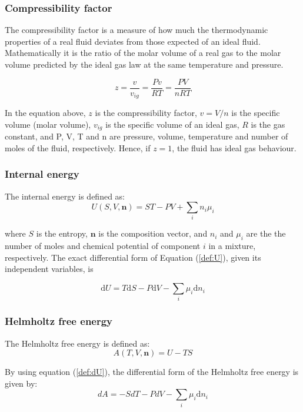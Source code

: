 \documentclass[internal,english]{sintefmemo2012}
\numberwithin{equation}{section}
\newcommand*{\reff}[1]{(\ref{#1})}
\begin{document}
\subsubsection*{Compressibility factor}
The compressibility factor is a measure of how much the thermodynamic properties of a real fluid deviates from those expected of an ideal fluid. Mathematically it is the ratio of the molar volume of a real gas to the molar volume predicted by the ideal gas law at the same temperature and pressure.

\begin{equation}
\label{def:z}
z = \frac{v}{v_{ig}} = \frac{Pv}{RT} = \frac{PV}{nRT}
\end{equation}

In the equation above, $z$ is the compressibility factor, $v = V/n$ is the specific volume (molar volume), $v_{ig}$ is the specific volume of an ideal gas, $R$ is the gas constant, and P, V, T and n are pressure, volume, temperature and number of moles of the fluid, respectively. Hence, if $z = 1$, the fluid has ideal gas behaviour.

\subsubsection*{Internal energy}
The internal energy is defined as:
\begin{equation}
\label{def:U}
U(S,V,\textbf{n}) = ST - PV + \sum_i n_i \mu _i
\end{equation}

where $S$ is the entropy, $\textbf{n}$ is the composition vector, and $n_i$ and $\mu _i$ are the the number of moles and chemical potential of component $i$ in a mixture, respectively. The exact differential form of Equation \reff{def:U}, given its independent variables, is

\begin{equation}
\label{def:dU}
\mathrm{d}U  = T\mathrm{d}S - P \mathrm{d}V - \sum_i \mu_i \mathrm{d}n_i
\end{equation}

\subsubsection*{Helmholtz free energy}
The Helmholtz free energy is defined as:
\begin{equation}
\label{def:A}
A(T,V,\textbf{n}) = U - TS
\end{equation}

By using equation \reff{def:dU}, the differential form of the Helmholtz free energy is given by:
\begin{equation}
\label{def:dA}
dA = -SdT - PdV -  \sum_i \mu_i \mathrm{d}n_i
\end{equation}
\end{document}
